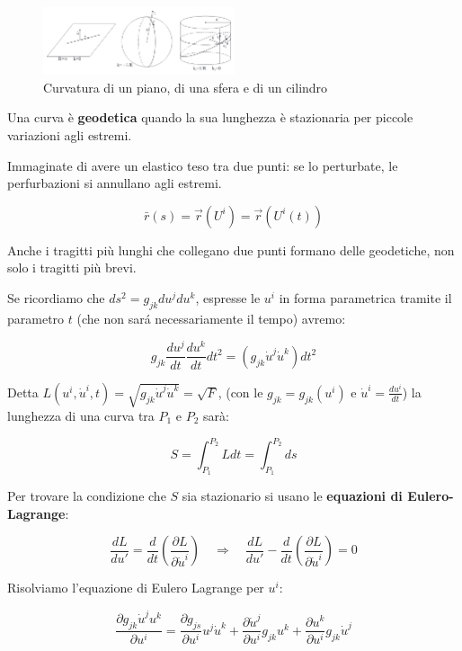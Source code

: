 \begin{figure}[H]
    \centering
    \includegraphics[width=0.5\textwidth]{assets/ex_curvature.png}
    \caption{Curvatura di un piano, di una sfera e di un cilindro}
    \label{fig:ex_curvature}
\end{figure}

Una curva è \textbf{geodetica} quando la sua lunghezza è stazionaria per piccole variazioni agli estremi. 

Immaginate di avere un elastico teso tra due punti: se lo perturbate, le perfurbazioni si annullano agli estremi.

$$
\bar r (s) = \vec r(U^i) = \vec r(U^i(t))
$$

\begin{observationblock}[Geodetica]
    Anche i tragitti più lunghi che collegano due punti formano delle geodetiche, non solo i tragitti più brevi.
\end{observationblock}

Se ricordiamo che $ds^2 = g_{jk} du^j du^k$, espresse le $u^i$ in forma parametrica tramite il parametro $t$ (che non sará
necessariamente il tempo) avremo:

$$
g_{jk}\dfrac{du^j}{dt} \dfrac{du^k}{dt} dt^2 
=
(g_{jk} \dot u^j \dot u^k) dt^2
$$

Detta $L(u^i, \dot u^i, t) = \sqrt{g_{jk} \dot u^j \dot u^k} = \sqrt{F}$, (con le $g_{jk} = g_{jk}(u^i)$ e $\dot u^i = \tfrac{du^i}{dt}$) la lunghezza di una curva tra $P_1$ e $P_2$ sarà:

$$
S = \int_{P_1}^{P_2} L dt = \int_{P_1}^{P_2} ds
$$

Per trovare la condizione che $S$ sia stazionario si usano le \textbf{equazioni di Eulero-Lagrange}:

$$
\dfrac{dL}{du'} = \dfrac{d}{dt} \left( \dfrac{\partial L}{\partial \dot u^i} \right) 
\quad \Rightarrow \quad
\dfrac{dL}{du'} - \dfrac{d}{dt} \left( \dfrac{\partial L}{\partial \dot u^i} \right) = 0
$$

Risolviamo l'equazione di Eulero Lagrange per $u^i$:

$$
\dfrac{\partial g_{jk}\dot u^j u^k}{\partial u^i} =
\dfrac{\partial g_{js}}{\partial u^i}u^j \dot u^k + \dfrac{\partial \dot u^j}{\partial u^i}g_{jk}u^k + \dfrac{\partial u^k}{\partial u^i}g_{jk}\dot u^j
$$

